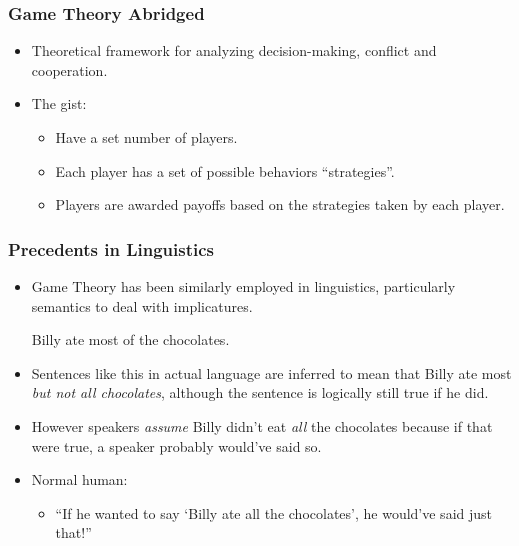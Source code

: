 \documentclass{beamer}
\begin{document}
\begin{frame}
	\frametitle{Game Theory Abridged}

	\begin{itemize}
		\item Theoretical framework for analyzing decision-making, conflict and cooperation.\pause
		\item The gist:\pause
			\begin{itemize}
				\item Have a set number of players.\pause
				\item Each player has a set of possible behaviors ``strategies''.\pause
				\item Players are awarded payoffs based on the strategies taken by each player.
			\end{itemize}
	\end{itemize}
\end{frame}

\begin{frame}
\frametitle{Precedents in Linguistics}\pause
\begin{itemize}
\item Game Theory has been similarly employed in linguistics, particularly semantics to deal with implicatures.\pause
\begin{exe}
\ex Billy ate most of the chocolates.
\end{exe}\pause
\item Sentences like this in actual language are inferred to mean that Billy ate most \emph{but not all chocolates}, although the sentence is logically still true if he did.\pause
\item However speakers \emph{assume} Billy didn't eat \emph{all} the chocolates because if that were true, a speaker probably would've said so.\pause
\item Normal human:\pause
	\begin{itemize}
		\item ``If he wanted to say `Billy ate all the chocolates', he would've said just that!''
	\end{itemize}
\end{itemize}
\end{frame}
\end{document}
